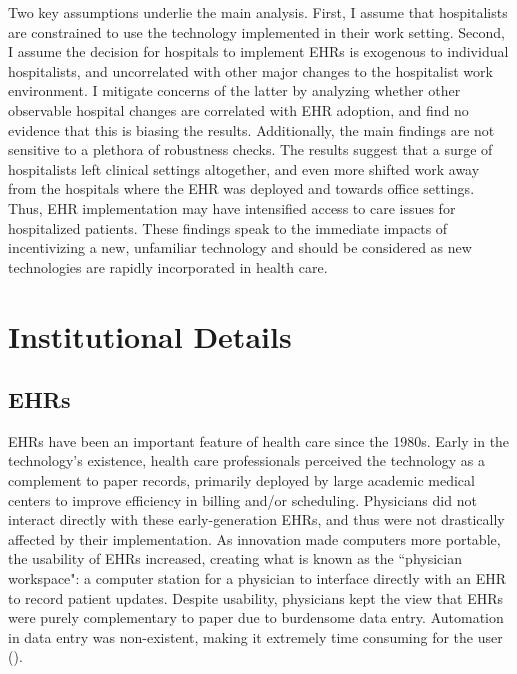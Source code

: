 \documentclass[12pt]{article}
\begin{document}
Two key assumptions underlie the main analysis. First, I assume that hospitalists are constrained to use the technology implemented in their work setting. Second, I assume the decision for hospitals to implement EHRs is exogenous to individual hospitalists, and uncorrelated with other major changes to the hospitalist work environment. I mitigate concerns of the latter by analyzing whether other observable hospital changes are correlated with EHR adoption, and find no evidence that this is biasing the results. Additionally, the main findings are not sensitive to a plethora of robustness checks. The results suggest that a surge of hospitalists left clinical settings altogether, and even more shifted work away from the hospitals where the EHR was deployed and towards office settings. Thus, EHR implementation may have intensified access to care issues for hospitalized patients. These findings speak to the immediate impacts of incentivizing a new, unfamiliar technology and should be considered as new technologies are rapidly incorporated in health care. 




\section{Institutional Details}

\subsection{EHRs}
EHRs have been an important feature of health care since the 1980s. Early in the technology's existence, health care professionals perceived the technology as a complement to paper records, primarily deployed by large academic medical centers to improve efficiency in billing and/or scheduling. Physicians did not interact directly with these early-generation EHRs, and thus were not drastically affected by their implementation. As innovation made computers more portable, the usability of EHRs increased, creating what is known as the ``physician workspace": a computer station for a physician to interface directly with an EHR to record patient updates. Despite usability, physicians kept the view that EHRs were purely complementary to paper due to burdensome data entry. Automation in data entry was non-existent, making it extremely time consuming for the user (\cite{evans2016electronic}). 
\end{document}
